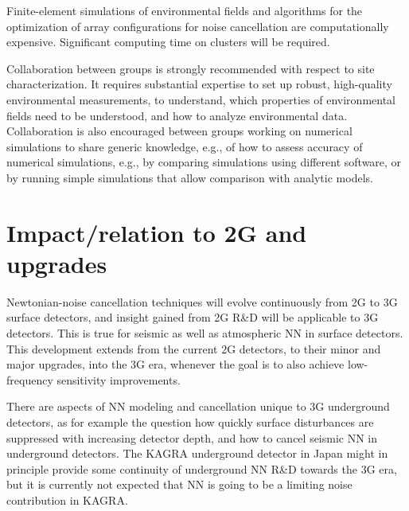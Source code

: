 Finite-element simulations of environmental fields and algorithms for the optimization of array configurations for noise cancellation are computationally expensive. Significant computing time on clusters will be required. 

Collaboration between groups is strongly recommended with respect to site characterization. It requires substantial expertise to set up robust, high-quality environmental measurements, to understand, which properties of environmental fields need to be understood, and how to analyze environmental data. Collaboration is also encouraged between groups working on numerical simulations to share generic knowledge, e.g., of how to assess accuracy of numerical simulations, e.g., by comparing simulations using different software, or by running simple simulations that allow comparison with analytic models.

\section{Impact/relation to 2G and upgrades}
Newtonian-noise cancellation techniques will evolve continuously from 2G to 3G surface detectors, and insight gained from 2G R\&D will be applicable to 3G detectors. This is true for seismic as well as atmospheric NN in surface detectors. This development extends from the current 2G detectors, to their minor and major upgrades, into the 3G era, whenever the goal is to also achieve low-frequency sensitivity improvements. 

There are aspects of NN modeling and cancellation unique to 3G underground detectors, as for example the question how quickly surface disturbances are suppressed with increasing detector depth, and how to cancel seismic NN in underground detectors. The KAGRA underground detector in Japan might in principle provide some continuity of underground NN R\&D towards the 3G era, but it is currently not expected that NN is going to be a limiting noise contribution in KAGRA.

